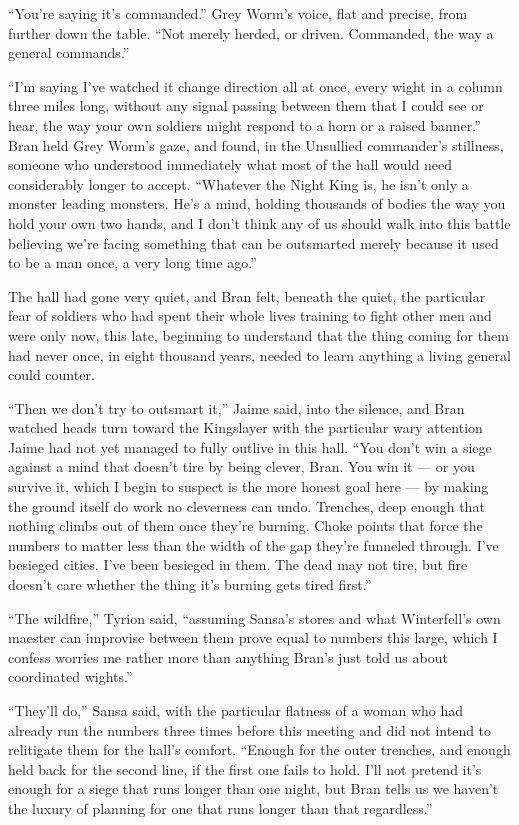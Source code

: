 “You’re saying it’s commanded.” Grey Worm’s voice, flat and precise, from further down the table. “Not merely herded, or driven. Commanded, the way a general commands.”

“I’m saying I’ve watched it change direction all at once, every wight in a column three miles long, without any signal passing between them that I could see or hear, the way your own soldiers might respond to a horn or a raised banner.” Bran held Grey Worm’s gaze, and found, in the Unsullied commander’s stillness, someone who understood immediately what most of the hall would need considerably longer to accept. “Whatever the Night King is, he isn’t only a monster leading monsters. He’s a mind, holding thousands of bodies the way you hold your own two hands, and I don’t think any of us should walk into this battle believing we’re facing something that can be outsmarted merely because it used to be a man once, a very long time ago.”

The hall had gone very quiet, and Bran felt, beneath the quiet, the particular fear of soldiers who had spent their whole lives training to fight other men and were only now, this late, beginning to understand that the thing coming for them had never once, in eight thousand years, needed to learn anything a living general could counter.

\sceneBreak

“Then we don’t try to outsmart it,” Jaime said, into the silence, and Bran watched heads turn toward the Kingslayer with the particular wary attention Jaime had not yet managed to fully outlive in this hall. “You don’t win a siege against a mind that doesn’t tire by being clever, Bran. You win it — or you survive it, which I begin to suspect is the more honest goal here — by making the ground itself do work no cleverness can undo. Trenches, deep enough that nothing climbs out of them once they’re burning. Choke points that force the numbers to matter less than the width of the gap they’re funneled through. I’ve besieged cities. I’ve been besieged in them. The dead may not tire, but fire doesn’t care whether the thing it’s burning gets tired first.”

“The wildfire,” Tyrion said, “assuming Sansa’s stores and what Winterfell’s own maester can improvise between them prove equal to numbers this large, which I confess worries me rather more than anything Bran’s just told us about coordinated wights.”

“They’ll do,” Sansa said, with the particular flatness of a woman who had already run the numbers three times before this meeting and did not intend to relitigate them for the hall’s comfort. “Enough for the outer trenches, and enough held back for the second line, if the first one fails to hold. I’ll not pretend it’s enough for a siege that runs longer than one night, but Bran tells us we haven’t the luxury of planning for one that runs longer than that regardless.”

